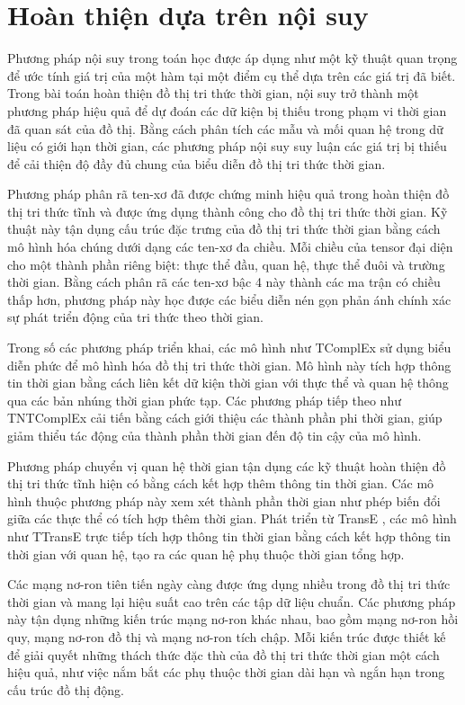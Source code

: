 \section{Hoàn thiện dựa trên nội suy}

Phương pháp nội suy trong toán học \cite{ref_article29} được áp dụng như một kỹ thuật quan trọng để ước tính giá trị của một hàm tại một điểm cụ thể dựa trên các giá trị đã biết. Trong bài toán hoàn thiện đồ thị tri thức thời gian, nội suy trở thành một phương pháp hiệu quả để dự đoán các dữ kiện bị thiếu trong phạm vi thời gian đã quan sát của đồ thị. Bằng cách phân tích các mẫu và mối quan hệ trong dữ liệu có giới hạn thời gian, các phương pháp nội suy suy luận các giá trị bị thiếu để cải thiện độ đầy đủ chung của biểu diễn đồ thị tri thức thời gian.

Phương pháp phân rã ten-xơ đã được chứng minh hiệu quả trong hoàn thiện đồ thị tri thức tĩnh và được ứng dụng thành công cho đồ thị tri thức thời gian. Kỹ thuật này tận dụng cấu trúc đặc trưng của đồ thị tri thức thời gian bằng cách mô hình hóa chúng dưới dạng các ten-xơ đa chiều. Mỗi chiều của tensor đại diện cho một thành phần riêng biệt: thực thể đầu, quan hệ, thực thể đuôi và trường thời gian. Bằng cách phân rã các ten-xơ bậc 4 này thành các ma trận có chiều thấp hơn, phương pháp này học được các biểu diễn nén gọn phản ánh chính xác sự phát triển động của tri thức theo thời gian.

Trong số các phương pháp triển khai, các mô hình như TComplEx \cite{ref_article31} sử dụng biểu diễn phức để mô hình hóa đồ thị tri thức thời gian. Mô hình này tích hợp thông tin thời gian bằng cách liên kết dữ kiện thời gian với thực thể và quan hệ thông qua các bản nhúng thời gian phức tạp. Các phương pháp tiếp theo như TNTComplEx \cite{ref_article31} cải tiến bằng cách giới thiệu các thành phần phi thời gian, giúp giảm thiểu tác động của thành phần thời gian đến độ tin cậy của mô hình.

Phương pháp chuyển vị quan hệ thời gian tận dụng các kỹ thuật hoàn thiện đồ thị tri thức tĩnh hiện có bằng cách kết hợp thêm thông tin thời gian. Các mô hình thuộc phương pháp này xem xét thành phần thời gian như phép biến đổi giữa các thực thể có tích hợp thêm thời gian. Phát triển từ TransE \cite{ref_article32}, các mô hình như TTransE \cite{ref_article32} trực tiếp tích hợp thông tin thời gian bằng cách kết hợp thông tin thời gian với quan hệ, tạo ra các quan hệ phụ thuộc thời gian tổng hợp.

Các mạng nơ-ron tiên tiến ngày càng được ứng dụng nhiều trong đồ thị tri thức thời gian và mang lại hiệu suất cao trên các tập dữ liệu chuẩn. Các phương pháp này tận dụng những kiến trúc mạng nơ-ron khác nhau, bao gồm mạng nơ-ron hồi quy, mạng nơ-ron đồ thị và mạng nơ-ron tích chập. Mỗi kiến trúc được thiết kế để giải quyết những thách thức đặc thù của đồ thị tri thức thời gian một cách hiệu quả, như việc nắm bắt các phụ thuộc thời gian dài hạn và ngắn hạn trong cấu trúc đồ thị động.


